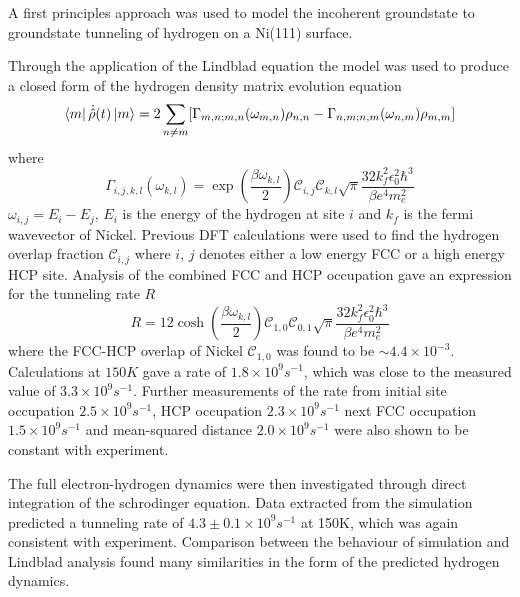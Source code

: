 A first principles
approach was used to
model the incoherent groundstate to
groundstate tunneling of
hydrogen on a Ni(111) surface.

Through the application of the
Lindblad equation the model
was used to produce a closed form
of the hydrogen density
matrix evolution equation
\begin{equation}
    \bra{m}\dot{\hat{\rho}}(t) \ket{m}  =
    2 \sum_{n\neq m}
    [  \Gamma_{m,n;m, n}(\omega_{m,n})\rho_{n, n}
        - \Gamma_{n,m;n, m}(\omega_{n,m})\rho_{m, m}]
\end{equation}
where
\begin{equation}
    \Gamma_{i,j, k,l}(\omega_{k,l})   =
    \exp{(\frac{\beta \omega_{k,l}}{2})}
    \mathcal{C}_{i,j} \mathcal{C}_{k,l}
    \sqrt{\pi} \frac{32 k_f^2 \epsilon_0^2 \hbar^3}{\beta e^4 m_e^2}
\end{equation}
\(\omega_{i,j} = E_i - E_j\),
\(E_i\) is the energy of the hydrogen at
site \(i\) and \(k_f\) is the fermi wavevector
of Nickel. Previous DFT calculations
were used to find the hydrogen
overlap fraction
\(\mathcal{C}_{i,j}\) where
\(i\), \(j\) denotes either
a low energy FCC or a
high energy HCP site\cite{Jianding-Zhu}.
Analysis of the combined FCC and HCP
occupation gave an expression
for the tunneling rate \(R\)
\begin{equation}
    R   =
    12\cosh{(\frac{\beta \omega_{k,l}}{2})}
    \mathcal{C}_{1,0}\mathcal{C}_{0,1}
    \sqrt{\pi} \frac{32 k_f^2 \epsilon_0^2 \hbar^3}{\beta e^4 m_e^2}
\end{equation}
where the FCC-HCP
overlap of Nickel
\(\mathcal{C}_{1,0}\)
was found to be \(\sim 4.4\times{}10^{-3}\).
Calculations at
\(150K\) gave a rate of
\(1.8\times 10^9s^{-1}\),
which was close to the
measured value of \(3.3\times 10^9s^{-1}\)\cite{Jianding-Zhu}.
Further measurements of the
rate from initial site
occupation \(2.5\times 10^{9}s^{-1}\), HCP occupation
\(2.3\times 10^{9}s^{-1}\)
next FCC occupation
\(1.5\times 10^{9}s^{-1}\)
and mean-squared distance
\(2.0\times{} 10^9s^{-1}\)
were also shown to be constant
with experiment.

The full electron-hydrogen
dynamics were then investigated
through direct integration
of the schrodinger equation.
Data extracted from the simulation
predicted a tunneling rate of
\(4.3\pm 0.1\times10^{9}s^{-1}\)
at 150K,
which was again
consistent with
experiment. Comparison
between the behaviour
of simulation
and Lindblad analysis
found many similarities
in the
form of the predicted
hydrogen dynamics.